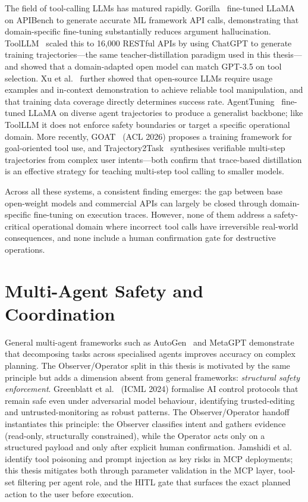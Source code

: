 The field of tool-calling LLMs has matured rapidly. Gorilla~\cite{patil2023gorilla} fine-tuned LLaMA on APIBench to generate accurate ML framework API calls, demonstrating that domain-specific fine-tuning substantially reduces argument hallucination. ToolLLM~\cite{qin2023toolllm} scaled this to 16,000 RESTful APIs by using ChatGPT to generate training trajectories---the same teacher-distillation paradigm used in this thesis---and showed that a domain-adapted open model can match GPT-3.5 on tool selection. Xu et al.~\cite{xu2023toolmanip} further showed that open-source LLMs require usage examples and in-context demonstration to achieve reliable tool manipulation, and that training data coverage directly determines success rate. AgentTuning~\cite{zeng2023agenttuning} fine-tuned LLaMA on diverse agent trajectories to produce a generalist backbone; like ToolLLM it does not enforce safety boundaries or target a specific operational domain. More recently, GOAT~\cite{min2025goat} (ACL 2026) proposes a training framework for goal-oriented tool use, and Trajectory2Task~\cite{wang2026trajectory2task} synthesises verifiable multi-step trajectories from complex user intents---both confirm that trace-based distillation is an effective strategy for teaching multi-step tool calling to smaller models.

Across all these systems, a consistent finding emerges: the gap between base open-weight models and commercial APIs can largely be closed through domain-specific fine-tuning on execution traces. However, none of them address a safety-critical operational domain where incorrect tool calls have irreversible real-world consequences, and none include a human confirmation gate for destructive operations.

\section{Multi-Agent Safety and Coordination}

General multi-agent frameworks such as AutoGen~\cite{wu2023autogen} and MetaGPT demonstrate that decomposing tasks across specialised agents improves accuracy on complex planning. The Observer/Operator split in this thesis is motivated by the same principle but adds a dimension absent from general frameworks: \emph{structural safety enforcement}. Greenblatt et al.~\cite{greenblatt2024aicontrol} (ICML 2024) formalise AI control protocols that remain safe even under adversarial model behaviour, identifying trusted-editing and untrusted-monitoring as robust patterns. The Observer/Operator handoff instantiates this principle: the Observer classifies intent and gathers evidence (read-only, structurally constrained), while the Operator acts only on a structured payload and only after explicit human confirmation. Jamshidi et al.~\cite{jamshidi2025mcpsecurity} identify tool poisoning and prompt injection as key risks in MCP deployments; this thesis mitigates both through parameter validation in the MCP layer, tool-set filtering per agent role, and the HITL gate that surfaces the exact planned action to the user before execution.

